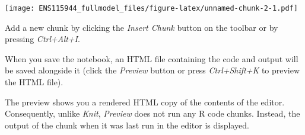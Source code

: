 \documentclass[
]{article}
\begin{document}
\texttt{[image: ENS115944\_fullmodel\_files/figure-latex/unnamed-chunk-2-1.pdf]}

Add a new chunk by clicking the \emph{Insert Chunk} button on the
toolbar or by pressing \emph{Ctrl+Alt+I}.

When you save the notebook, an HTML file containing the code and output
will be saved alongside it (click the \emph{Preview} button or press
\emph{Ctrl+Shift+K} to preview the HTML file).

The preview shows you a rendered HTML copy of the contents of the
editor. Consequently, unlike \emph{Knit}, \emph{Preview} does not run
any R code chunks. Instead, the output of the chunk when it was last run
in the editor is displayed.
\end{document}
